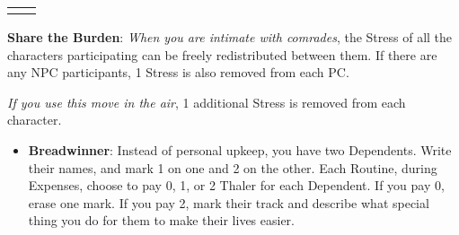 \documentclass[twoside,headings,a4paper]{article}
\begin{document}
{\begin{NiceTabular}[rules/width=0.5mm]{X|X}
{            
        }
    \end{NiceTabular}
    \PlaybookRuleL
    \textbf{Share the Burden}: \textit{When you are intimate with comrades}, the Stress of all the characters
    participating can be freely redistributed between them. If there are any NPC participants, 1
    Stress is also removed from each PC.

    \textit{If you use this move in the air}, 1 additional Stress is removed from each character.
    \vfill

    \columnbreak
    \begin{itemize}
        \renewcommand{\labelitemi}{{\LARGE\bullet}}
        \item \textbf{Breadwinner}: Instead of personal upkeep, you have two Dependents. Write their names,
              and mark 1 on one and 2 on the other. Each Routine, during Expenses, choose to pay 0,
              1, or 2 Thaler for each Dependent. If you pay 0, erase one mark. If you pay 2, mark their
              track and describe what special thing you do for them to make their lives easier.


\end{itemize}}
\end{document}

